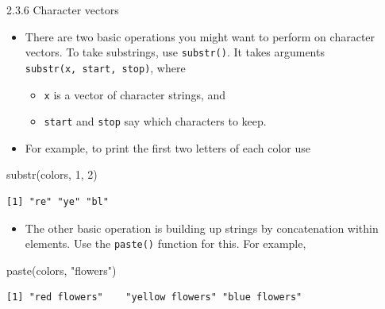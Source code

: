 \documentclass[
  9pt,
  a4paper,
  ignorenonframetext,
  notheorems]{beamer}
\newenvironment{Shaded}{\begin{snugshade}}{\end{snugshade}}
\newcommand{\DecValTok}[1]{\textcolor[rgb]{0.68,0.00,0.00}{#1}}
\newcommand{\FunctionTok}[1]{\textcolor[rgb]{0.28,0.35,0.67}{#1}}
\newcommand{\NormalTok}[1]{\textcolor[rgb]{0.00,0.23,0.31}{#1}}
\newcommand{\StringTok}[1]{\textcolor[rgb]{0.13,0.47,0.30}{#1}}
\providecommand{\tightlist}{%
  \setlength{\itemsep}{0pt}\setlength{\parskip}{0pt}}\usepackage{longtable,booktabs,array}
\begin{document}
\begin{frame}[fragile]{2.3.6 Character vectors}
\begin{itemize}
\tightlist
\item
  There are two basic operations you might want to perform on character
  vectors. To take substrings, use \texttt{substr()}. It takes arguments
  \texttt{substr(x,\ start,\ stop)}, where

  \begin{itemize}
  \tightlist
  \item
    \texttt{x} is a vector of character strings, and
  \item
    \texttt{start} and \texttt{stop} say which characters to keep.
  \end{itemize}
\end{itemize}
\end{frame}

\begin{frame}[fragile]
\begin{itemize}
\tightlist
\item
  For example, to print the first two letters of each color use
\end{itemize}

\begin{Shaded}
\begin{Highlighting}[]
\FunctionTok{substr}\NormalTok{(colors, }\DecValTok{1}\NormalTok{, }\DecValTok{2}\NormalTok{)}
\end{Highlighting}
\end{Shaded}

\begin{verbatim}
[1] "re" "ye" "bl"
\end{verbatim}

\begin{itemize}
\tightlist
\item
  The other basic operation is building up strings by concatenation
  within elements. Use the \texttt{paste()} function for this. For
  example,
\end{itemize}

\begin{Shaded}
\begin{Highlighting}[]
\FunctionTok{paste}\NormalTok{(colors, }\StringTok{"flowers"}\NormalTok{)}
\end{Highlighting}
\end{Shaded}

\begin{verbatim}
[1] "red flowers"    "yellow flowers" "blue flowers"  
\end{verbatim}
\end{frame}
\end{document}
